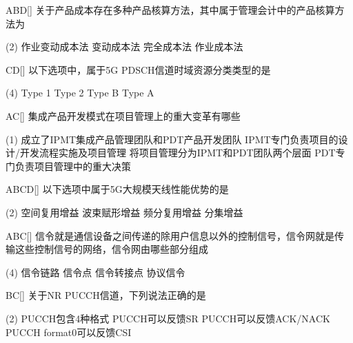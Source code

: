 \begin{choice}{\;ABD\;}[]
    关于产品成本存在多种产品核算方法，其中属于管理会计中的产品核算方法为
    \begin{tasks}(2)
        \task 作业变动成本法
        \task 变动成本法
        \task 完全成本法
        \task 作业成本法
    \end{tasks}
\end{choice}

\begin{choice}{\;CD\;}[]
    以下选项中，属于5G PDSCH信道时域资源分类类型的是
    \begin{tasks}(4)
        \task Type 1
        \task Type 2
        \task Type B
        \task Type A
    \end{tasks}
\end{choice}

\begin{choice}{\;AC\;}[]
    集成产品开发模式在项目管理上的重大变革有哪些
    \begin{tasks}(1)
        \task 成立了IPMT集成产品管理团队和PDT产品开发团队
        \task IPMT专门负责项目的设计/开发流程实施及项目管理
        \task 将项目管理分为IPMT和PDT团队两个层面
        \task PDT专门负责项目管理中的重大决策
    \end{tasks}
\end{choice}


\begin{choice}{\;ABCD\;}[]
    以下选项中属于5G大规模天线性能优势的是
    \begin{tasks}(2)
        \task 空间复用增益
        \task 波束赋形增益
        \task 频分复用增益
        \task 分集增益
    \end{tasks}
\end{choice}


\begin{choice}{\;ABC\;}[]
    信令就是通信设备之间传递的除用户信息以外的控制信号，信令网就是传输这些控制信号的网络，信令网由哪些部分组成
    \begin{tasks}(4)
        \task 信令链路
        \task 信令点
        \task 信令转接点
        \task 协议信令
    \end{tasks}
\end{choice}


\begin{choice}{\;BC\;}[]
    关于NR PUCCH信道，下列说法正确的是
    \begin{tasks}(2)
        \task PUCCH包含4种格式
        \task PUCCH可以反馈SR
        \task PUCCH可以反馈ACK/NACK
        \task PUCCH format0可以反馈CSI
    \end{tasks}
\end{choice}


